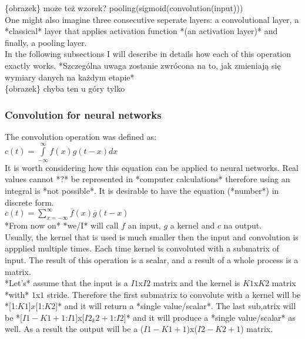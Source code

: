 \documentclass[a4paper,10pt]{report}
\begin{document}
	\{obrazek\}  może też wzorek? pooling(sigmoid(convolution(input))) \\
	
	One might also imagine three consecutive seperate layers: a convolutional layer, a *classical* layer that applies activation function *(an activation layer)* and finally, a pooling layer.\\
	
	In the following subsections I will describe in details how each of this operation exactly works. *Szczególna uwaga zostanie zwrócona na to, jak zmieniają się wymiary danych na każdym etapie*\\
	
	\{obrazek\} chyba ten u góry tylko
	
	\subsubsection{Convolution for neural networks}%
	  The convolution operation was defined as: \\
	  
	  $c(t) = \int\limits_{-\infty}^\infty f(x)g(t-x)dx$ \\
	  
	  It is worth considering how this equation can be applied to neural networks. Real values cannot *?* be represented in *computer calculations* therefore using an integral is *not possible*. It is desirable to have the equation (*number*) in discrete form.\\
	  
	  $\overline{c}(t) = \sum\limits_{x = -\infty}^\infty \overline{f}(x)\overline{g}(t-x)$ \\%
	  
	  *From now on* *we/I* will call $f$ an input, $g$ a kernel and $c$ na output.\\
	  
	  Usually, the kernel that is used is much smaller then the input and convolution is appplied multiple times. Each time kernel is convoluted with a submatrix of input. The result of this operation is a scalar, and a result of a whole process is a matrix.\\
	  
	  *Let's* assume that the input is a $I1$x$I2$ matrix and the kernel is $K1$x$K2$ matrix *with* $1$x$1$ stride. Therefore the first submatrix to convolute with a kernel will be *[1:$K1$]$x$[1:$K2$]* and it will return a *single value/scalar*. The last sub,atrix will be *[$I1-K1+1$:$I1$]x[$I2_k2+1$:$I2$]* and it will produce a  *single value/scalar* as well. As a result the output will be a ($I1-K1+1$)x($I2-K2+1$) matrix.\\
	  
\end{document}
